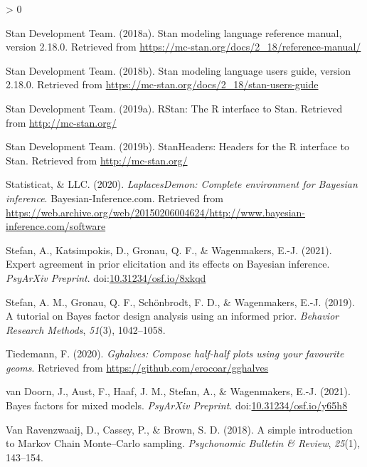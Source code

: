 \documentclass[
  english,
  doc,floatsintext]{apa6}
\newlength{\cslhangindent}
\newenvironment{CSLReferences}[2] %
 {%
  \setlength{\parindent}{0pt}
  \ifodd #1 \everypar{\setlength{\hangindent}{\cslhangindent}}\ignorespaces\fi
  \ifnum #2 > 0
  \setlength{\parskip}{#2\baselineskip}
  \fi
 }%
 {}
\begin{document}
\begin{CSLReferences}{1}{0}
\leavevmode\hypertarget{ref-stan2018b}{}%
Stan Development Team. (2018a). Stan modeling language reference manual, version 2.18.0. Retrieved from \url{https://mc-stan.org/docs/2_18/reference-manual/}

\leavevmode\hypertarget{ref-stan2018a}{}%
Stan Development Team. (2018b). Stan modeling language users guide, version 2.18.0. Retrieved from \url{https://mc-stan.org/docs/2_18/stan-users-guide}

\leavevmode\hypertarget{ref-R-rstan}{}%
Stan Development Team. (2019a). {RStan}: The {R} interface to {Stan}. Retrieved from \url{http://mc-stan.org/}

\leavevmode\hypertarget{ref-R-StanHeaders}{}%
Stan Development Team. (2019b). {StanHeaders}: Headers for the {R} interface to {Stan}. Retrieved from \url{http://mc-stan.org/}

\leavevmode\hypertarget{ref-R-LaplacesDemon}{}%
Statisticat, \& LLC. (2020). \emph{LaplacesDemon: Complete environment for {Bayesian} inference}. Bayesian-Inference.com. Retrieved from \url{https://web.archive.org/web/20150206004624/http://www.bayesian-inference.com/software}

\leavevmode\hypertarget{ref-Stefan_etal2021}{}%
Stefan, A., Katsimpokis, D., Gronau, Q. F., \& Wagenmakers, E.-J. (2021). Expert agreement in prior elicitation and its effects on {Bayesian} inference. \emph{PsyArXiv Preprint}. doi:\href{https://doi.org/10.31234/osf.io/8xkqd}{10.31234/osf.io/8xkqd}

\leavevmode\hypertarget{ref-stefan2019tutorial}{}%
Stefan, A. M., Gronau, Q. F., Schönbrodt, F. D., \& Wagenmakers, E.-J. (2019). A tutorial on {Bayes} factor design analysis using an informed prior. \emph{Behavior Research Methods}, \emph{51}(3), 1042--1058.

\leavevmode\hypertarget{ref-R-gghalves}{}%
Tiedemann, F. (2020). \emph{Gghalves: Compose half-half plots using your favourite geoms}. Retrieved from \url{https://github.com/erocoar/gghalves}

\leavevmode\hypertarget{ref-van2021bayes}{}%
van Doorn, J., Aust, F., Haaf, J. M., Stefan, A., \& Wagenmakers, E.-J. (2021). Bayes factors for mixed models. \emph{PsyArXiv Preprint}. doi:\href{https://doi.org/10.31234/osf.io/y65h8}{10.31234/osf.io/y65h8}

\leavevmode\hypertarget{ref-van2018simple}{}%
Van Ravenzwaaij, D., Cassey, P., \& Brown, S. D. (2018). A simple introduction to {Markov Chain Monte--Carlo} sampling. \emph{Psychonomic Bulletin \& Review}, \emph{25}(1), 143--154.


\end{CSLReferences}
\end{document}
